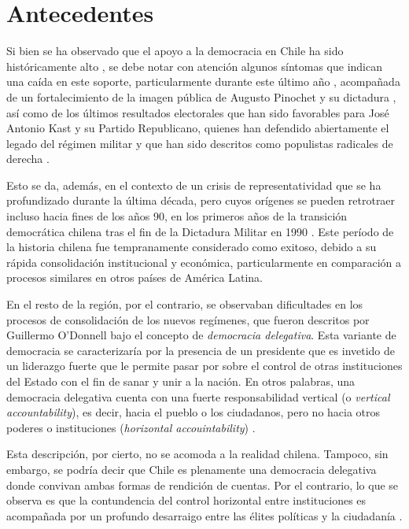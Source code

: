 \documentclass[12pt,twoside]{templates/facsothesis}
\begin{document}
\hypertarget{antecedentes}{%
\chapter{Antecedentes}\label{antecedentes}}

Si bien se ha observado que el apoyo a la democracia en Chile ha sido históricamente alto \citep{navia2019}, se debe notar con atención algunos síntomas que indican una caída en este soporte, particularmente durante este último año \citep{cep}, acompañada de un fortalecimiento de la imagen pública de Augusto Pinochet y su dictadura \citep{cadem2023, cerc-mori}, así como de los últimos resultados electorales que han sido favorables para José Antonio Kast y su Partido Republicano, quienes han defendido abiertamente el legado del régimen militar y que han sido descritos como populistas radicales de derecha \citep{diaz2023}.

Esto se da, además, en el contexto de un crisis de representatividad que se ha profundizado durante la última década, pero cuyos orígenes se pueden retrotraer incluso hacia fines de los años 90, en los primeros años de la transición democrática chilena tras el fin de la Dictadura Militar en 1990 \citep{luna2016}. Este período de la historia chilena fue tempranamente considerado como exitoso, debido a su rápida consolidación institucional y económica, particularmente en comparación a procesos similares en otros países de América Latina.

En el resto de la región, por el contrario, se observaban dificultades en los procesos de consolidación de los nuevos regímenes, que fueron descritos por Guillermo O'Donnell \citeyearpar{odonnell1994} bajo el concepto de \emph{democracia delegativa}. Esta variante de democracia se caracterizaría por la presencia de un presidente que es invetido de un liderazgo fuerte que le permite pasar por sobre el control de otras instituciones del Estado con el fin de sanar y unir a la nación. En otros palabras, una democracia delegativa cuenta con una fuerte responsabilidad vertical (o \emph{vertical accountability}), es decir, hacia el pueblo o los ciudadanos, pero no hacia otros poderes o instituciones (\emph{horizontal accouintability}) \citep{odonnell1994}.

Esta descripción, por cierto, no se acomoda a la realidad chilena. Tampoco, sin embargo, se podría decir que Chile es plenamente una democracia delegativa donde convivan ambas formas de rendición de cuentas. Por el contrario, lo que se observa es que la contundencia del control horizontal entre instituciones es acompañada por un profundo desarraigo entre las élites políticas y la ciudadanía \citep{luna2016}.
\end{document}
